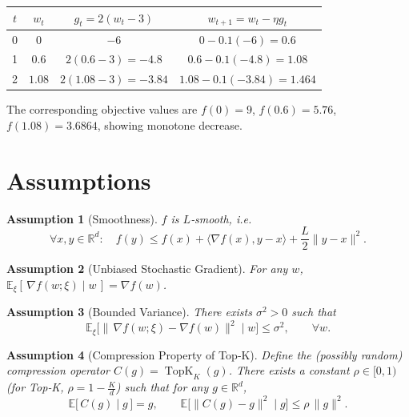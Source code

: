 \documentclass{article}
\newtheorem{assumption}{Assumption}
\newcommand{\TopK}[2]{\operatorname{TopK}_{#1}(#2)} %
\begin{document}
\begin{center}
\begin{tabular}{c|c|c|c}
$t$ & $w_t$ & $g_t=2(w_t-3)$ & $w_{t+1}=w_t-\eta g_t$ \\ \midrule
0 & $0$ & $-6$ & $0-0.1(-6)=0.6$ \\
1 & $0.6$ & $2(0.6-3)=-4.8$ & $0.6-0.1(-4.8)=1.08$ \\
2 & $1.08$ & $2(1.08-3)=-3.84$ & $1.08-0.1(-3.84)=1.464$ \\
\end{tabular}
\end{center}
The corresponding objective values are $f(0)=9$, $f(0.6)=5.76$, $f(1.08)=3.6864$, showing monotone decrease.

\newpage

\section*{Assumptions}
\begin{assumption}[Smoothness]\label{as:smooth}
$f$ is $L$‑smooth, i.e.
\[
\forall x,y\in\mathbb{R}^{d}:\quad
f(y)\le f(x)+\langle\nabla f(x),y-x\rangle+\frac{L}{2}\|y-x\|^{2}.
\]
\end{assumption}

\begin{assumption}[Unbiased Stochastic Gradient]\label{as:unbiased}
For any $w$, $\mathbb{E}_{\xi}[\,\nabla f(w;\xi)\mid w\,]=\nabla f(w)$.
\end{assumption}

\begin{assumption}[Bounded Variance]\label{as:variance}
There exists $\sigma^{2}>0$ such that
\[
\mathbb{E}_{\xi}\big[\|\,\nabla f(w;\xi)-\nabla f(w)\|^{2}\mid w\big]\le\sigma^{2},
\qquad\forall w.
\]
\end{assumption}

\begin{assumption}[Compression Property of Top‑K]\label{as:compress}
Define the (possibly random) compression operator $C(g)=\TopK{K}{g}$.  
There exists a constant $\rho\in[0,1)$ (for Top‑K, $\rho=1-\frac{K}{d}$) such that for any $g\in\mathbb{R}^{d}$,
\[
\mathbb{E}\!\big[\,C(g)\mid g\,\big]=g, \qquad
\mathbb{E}\!\big[\|C(g)-g\|^{2}\mid g\big]\le\rho\,\|g\|^{2}.
\tag{A4}
\]
\end{assumption}
\end{document}
